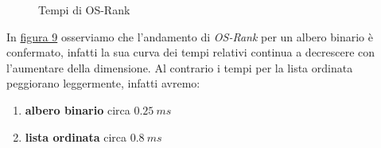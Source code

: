 \documentclass[onecolumn]{article}
\begin{document}
\begin{figure}[H]
	\caption{Tempi di OS-Rank}
	\label{fig:os-rank-l}
\end{figure}

In \hyperref[fig:os-rank-l]{figura 9} osserviamo che l'andamento di \textit{OS-Rank} per un albero binario è confermato, infatti la sua curva dei tempi relativi continua a decrescere con l'aumentare della dimensione. Al contrario i tempi per la lista ordinata peggiorano leggermente, infatti avremo:

\begin{enumerate}
    \item \textbf{albero binario} circa \(0.25\:ms\)
    \item \textbf{lista ordinata} circa \(0.8\:ms\)
\end{enumerate}
\end{document}
